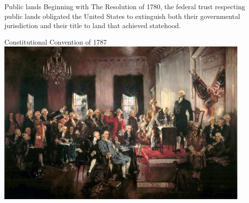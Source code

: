 \begin{frame}
    \begin{alertblock}{Public lands}
        Beginning with The Resolution of 1780, the federal trust respecting public lands obligated the United States to extinguish both their governmental jurisdiction and their title to land that achieved statehood.
    \end{alertblock}
\end{frame}


% 

\begin{frame}{Constitutional Convention of 1787}
    \centering
    \includegraphics[width=0.95\textwidth]{img/constitutional-convention.jpg} \\
\end{frame}

